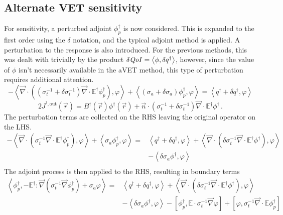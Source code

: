 \documentclass[12pt]{report}
\newcommand{\vr}{\vec{r}}
\newcommand{\bra}{\left\langle}
\newcommand{\ket}{\right\rangle}
\newcommand{\sbra}{\left[}
\newcommand{\sket}{\right]}
\renewcommand{\div}{\vec{\nabla} \cdot}
\newcommand{\grad}{\vec{\nabla}}
\newcommand{\vn}{\vec{n}}
\newcommand{\Edd}{\mathbb{E}}
\newcommand{\BEdd}{B}
\newcommand{\siga}{\sigma_a}
\newcommand{\isigt}{\sigma_t^{-1}}
\newcommand{\qoi}{{\it QoI}\xspace}
\begin{document}
\subsection{Alternate VET sensitivity}
For sensitivity, a perturbed adjoint $\phi^\dag_p$ is now considered. This is expanded to the first order using the $\delta$ notation, and the typical adjoint method is applied. A perturbation to the response is also introduced. For the previous methods, this was dealt with trivially by the product $\delta \qoi = \bra \phi , \delta q^\dag \ket$, however, since the value of $\phi$ isn't necessarily available in the aVET method, this type of perturbation requires additional attention.
\begin{equation}
- \bra \div \left( (\isigt + \delta \isigt )\div \Edd^\dag \phi^\dag_p  \right), \varphi \ket + \bra (\siga + \delta \siga) \phi^\dag_p , \varphi \ket  = \bra q^\dag + \delta q^\dag, \varphi \ket
\end{equation}
\begin{equation}
2 J^{^\dag,\text{out}}(\vr) = \BEdd^\dag(\vr) \phi^\dag(\vr)  + \vn \cdot (\isigt + \delta \isigt) \div \Edd^\dag  \phi^\dag  \,.
\end{equation}
The perturbation terms are collected on the RHS leaving the original operator on the LHS.
\begin{equation}
\begin{split}
- \bra\div \left( \isigt \div \Edd^\dag \phi^\dag_p  \right), \varphi \ket + \bra \siga  \phi^\dag_p , \varphi \ket  =& \bra q^\dag + \delta q^\dag, \varphi \ket + \bra\div \left( \delta \isigt \div \Edd^\dag \phi^\dag  \right), \varphi \ket \\ 
&- \bra \delta \siga \phi^\dag , \varphi \ket \\
\end{split}
\end{equation}
The adjoint process is then applied to the RHS, resulting in boundary terms
\begin{equation}
\begin{split}
 \bra  \phi^\dag_p , -\Edd^\dag : \grad \left( \isigt \grad \phi^\dag_p  \right) + \siga  \varphi \ket  =& \bra q^\dag + \delta q^\dag, \varphi \ket + \bra\div \left( \delta \isigt \div \Edd^\dag \phi^\dag  \right), \varphi \ket \\ 
&- \bra \delta \siga \phi^\dag , \varphi \ket - \sbra \phi^\dag_p, \Edd \cdot \isigt \grad \varphi \sket + \sbra \varphi, \isigt \div \Edd \phi^\dag_p \sket  \\
\end{split}
\end{equation}
\end{document}
